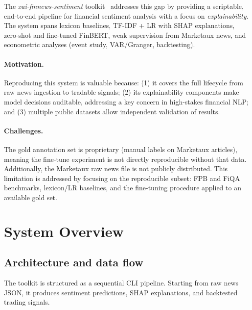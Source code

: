 \documentclass[11pt]{article}
\begin{document}
The \textit{xai-finnews-sentiment}
toolkit~\cite{xai_finnews_2025} addresses this gap by providing a
scriptable, end-to-end pipeline for financial sentiment analysis with a focus
on \textit{explainability}. The system spans lexicon baselines, TF-IDF + LR
with SHAP explanations, zero-shot and fine-tuned FinBERT, weak supervision
from Marketaux news, and econometric analyses (event study, VAR/Granger,
backtesting).

\paragraph{Motivation.} Reproducing this system is valuable because:
(1) it covers the full lifecycle from raw news ingestion to tradable signals;
(2) its explainability components make model decisions auditable, addressing a
key concern in high-stakes financial NLP; and
(3) multiple public datasets allow independent validation of results.

\paragraph{Challenges.}
The gold annotation set is proprietary (manual labels on Marketaux articles),
meaning the fine-tune experiment is not directly reproducible without that
data. Additionally, the Marketaux raw news file is not publicly distributed.
This limitation is addressed by focusing on the reproducible subset: FPB and FiQA
benchmarks, lexicon/LR baselines, and the fine-tuning procedure applied to an
available gold set.

\section{System Overview}
\label{sec:system}

\subsection{Architecture and data flow}

The toolkit is structured as a sequential CLI pipeline.
Starting from raw news JSON, it produces sentiment predictions, SHAP
explanations, and backtested trading signals.
\end{document}
